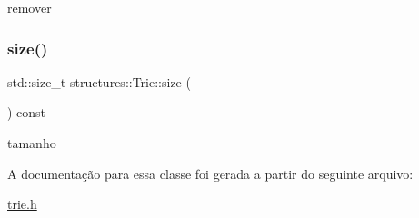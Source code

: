 remover 

\mbox{\label{classstructures_1_1Trie_a4a4081191fa839c7d41e85577a46d7c7}} 
\subsubsection{\texorpdfstring{size()}{size()}}
{\footnotesize\ttfamily std\+::size\+\_\+t structures\+::\+Trie\+::size (\begin{DoxyParamCaption}{ }\end{DoxyParamCaption}) const}



tamanho 



A documentação para essa classe foi gerada a partir do seguinte arquivo\+:\begin{DoxyCompactItemize}
\item 
\mbox{\hyperlink{trie_8h}{trie.\+h}}\end{DoxyCompactItemize}
